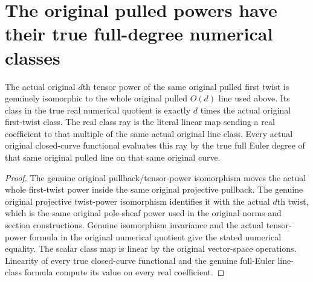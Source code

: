 \section{The original pulled powers have their true full-degree numerical classes}
\label{sec:native-pulled-projective-numerical-classes}

\begin{theorem}
\label{thm:native-pulled-projective-numerical-powers}
\leanok
{}
The actual original $d$th tensor power of the same original pulled first
twist is genuinely isomorphic to the whole original pulled $O(d)$ line
used above. Its class in the true real numerical quotient is exactly $d$
times the actual original first-twist class. The real class ray is the
literal linear map sending a real coefficient to that multiple of the
same actual original line class. Every actual original closed-curve
functional evaluates this ray by the true full Euler degree of that same
original pulled line on that same original curve.
\end{theorem}
\begin{proof}
The genuine original pullback/tensor-power isomorphism moves the actual
whole first-twist power inside the same original projective pullback.
The genuine original projective twist-power isomorphism identifies it
with the actual $d$th twist, which is the same original pole-sheaf power
used in the original norms and section constructions. Genuine isomorphism
invariance and the actual tensor-power formula in the original numerical
quotient give the stated numerical equality. The scalar class map is
linear by the original vector-space operations. Linearity of every true
closed-curve functional and the genuine full-Euler line-class formula
compute its value on every real coefficient.
\end{proof}

